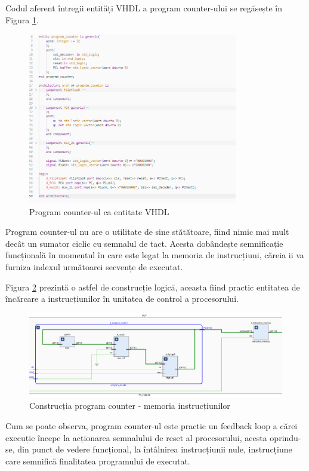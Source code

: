 \documentclass[12pt]{article}
\begin{document}
 \newpage
Codul aferent întregii entități VHDL a program counter-ului se regăsește în Figura \ref{Figura:38}.
 \begin{figure}[h!]
 \includegraphics[width=0.815\textwidth]{programcountercode.png}
 \centering
 \caption{Program counter-ul ca entitate VHDL}
 \label{Figura:38}
 \end{figure}
 
 Program counter-ul nu are o utilitate de sine stătătoare, fiind nimic mai mult decât un sumator ciclic cu semnalul de tact. Acesta dobândește semnificație funcțională în momentul în care este legat la memoria de instrucțiuni, căreia ii va furniza indexul următoarei secvențe de executat.
 
 Figura  \ref{Figura:39} prezintă o astfel de construcție logică, aceasta fiind practic entitatea de încărcare a instrucțiunilor în unitatea de control a procesorului.
 
  \begin{figure}[h!]
 \includegraphics[width=1.0\textwidth]{pcinstmem2.png}
 \centering
 \caption{Construcția program counter - memoria instrucțiunilor}
 \label{Figura:39}
 \end{figure}
 
 Cum se poate observa, program counter-ul este practic un feedback loop a cărei execuție începe la acționarea semnalului de reset al procesorului, acesta oprindu-se, din punct de vedere funcțional, la întâlnirea instrucțiunii nule, instrucțiune care semnifică finalitatea programului de executat.
 
\end{document}
